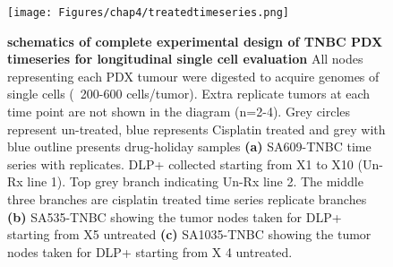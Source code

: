 \begin{figure}
\centering
\texttt{[image: Figures/chap4/treatedtimeseries.png]}
  \caption[TNBC PDX timeseries clonal dynamics under drug perturbations]
	{\small
	\textbf{schematics of complete experimental design of TNBC PDX timeseries for longitudinal single cell evaluation}
	     All nodes representing each PDX tumour were digested to acquire genomes of single cells (~200-600 cells/tumor). Extra replicate tumors at each time point are not shown in the diagram (n=2-4). Grey circles represent un-treated, blue represents Cisplatin treated and grey with blue outline presents drug-holiday samples 
	     \textbf{(a)} SA609-TNBC time series with replicates. DLP+ collected starting from X1 to X10 (Un-Rx line 1). Top grey branch indicating Un-Rx line 2. The middle three branches are cisplatin treated time series replicate branches 
	     \textbf{(b)} SA535-TNBC  showing the tumor nodes taken for DLP+ starting from X5 untreated  \textbf{(c)} SA1035-TNBC  showing the tumor nodes taken for DLP+ starting from X 4 untreated.}
     \label{fig:treatedtimeseriesmanuscript}

\end{figure}


